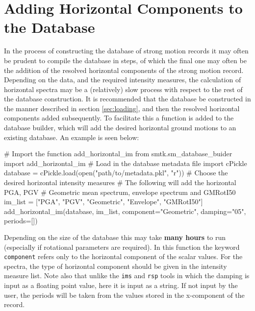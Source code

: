 \section{Adding Horizontal Components to the Database}

In the process of constructing the database of strong motion records it may often be prudent to compile the database in steps, of which the final one may often be the addition of the resolved horizontal components of the strong motion record. Depending on the data, and the required intensity measures, the calculation of horizontal spectra may be a (relatively) slow process with respect to the rest of the database construction. It is recommended that the database be constructed in the manner described in section \ref{sec:loading}, and then the resolved horizontal components added subsequently. To facilitate this a function is added to the database builder, which will add the desired horizontal ground motions to an existing database. An example is seen below:

\begin{python}[frame=single]
# Import the function add_horizontal_im
from smtk.sm_database_buider import add_horizontal_im
# Load in the database metadata file
import cPickle
database = cPickle.load(open("path/to/metadata.pkl", "r"))
# Choose the desired horizontal intensity measures
# The following will add the horizontal PGA, PGV
# Geometric mean spectrum, envelope spectrum and GMRotI50
im_list = ["PGA", "PGV", "Geometric", "Envelope", "GMRotI50"]
add_horizontal_im(database,
                  im_list, 
                  component="Geometric",
                  damping="05",
                  periods=[])
\end{python}

Depending on the size of the database this may take \textbf{many hours} to run (especially if rotational parameters are required). In this function the keyword \verb=component= refers only to the horizontal component of the scalar values. For the spectra, the type of horizontal component should be given in the intensity measure list. Note also that unlike the \verb=ims= and \verb=rsp= tools in which the damping is input as a floating point value, here it is input as a string. If not input by the user, the periods will be taken from the values stored in the x-component of the record. 


